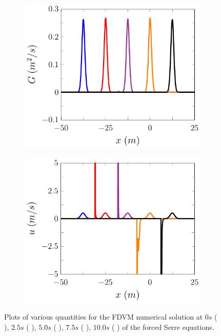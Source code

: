 \begin{figure}
\begin{subfigure}{0.5\textwidth}
	\end{subfigure}
	\begin{subfigure}{0.5\textwidth}
		\includegraphics[width=\textwidth]{./chp5/figures/Forced/Dry/P2P/FDVMExG.pdf}
		\vspace{0.5cm}
	\end{subfigure}%
	\begin{subfigure}{0.5\textwidth}
		\includegraphics[width=\textwidth]{./chp5/figures/Forced/Dry/P2P/FDVMExu.pdf}
		\vspace{0.5cm}
	\end{subfigure}
	\caption{Plots of various quantities for the FDVM numerical solution at $0s$ ({\color{blue} \solidrule}), $2.5s$ ({\color{red} \solidrule}), $5.0s$ ({\color{violet!80!white} \solidrule}), $7.5s$ ({\color{orange} \solidrule}), $10.0s$ ({\color{black} \solidrule}) of the forced Serre equations.}
	\label{fig:ForcedFDVMP2PExAll}
\end{figure}


